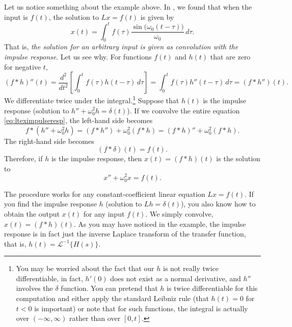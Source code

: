 Let us notice something about the example above. 
In ,
we found that
when the input is $f(t)$, the solution to $Lx = f(t)$
is given by
\begin{equation*}
x(t) = 
\int_0^t
f(\tau) 
\frac{\sin \bigl( \omega_0 (t-\tau) \bigr)}{\omega_0} \, d\tau .
\end{equation*}
That is, \emph{the solution for an arbitrary input is given as
convolution with the impulse response}.  Let us see why.
For functions $f(t)$ and $h(t)$ that are zero for negative $t$,
\begin{equation*}
(f * h)''(t) =
\frac{d^2}{dt^2}\left[
\int_0^t
f(\tau) 
h(t-\tau) \, d\tau \right]
=
\int_0^t
f(\tau) 
h''(t-\tau) \, d\tau
= (f * h'')(t) .
\end{equation*}
We differentiate twice under the
integral.\footnote{%
You may be worried about the fact that our $h$
is not really twice differentiable, in fact, $h'(0)$
does not exist as a normal derivative, and $h''$ involves
the $\delta$ function.
You can pretend that $h$ is twice differentiable
for this computation and either apply the standard
Leibniz rule (that $h(t)=0$ for $t < 0$ is important) or
note that for such functions,
the integral is actually over
$(-\infty,\infty)$ rather than over $[0,t]$.}
Suppose that $h(t)$ is the impulse response (solution to $h''+\omega_0^2 h = \delta(t)$).
If we convolve the entire equation \eqref{eq:lteximpulseresp},
the left-hand side becomes
\begin{equation*}
f * (h'' + \omega_0^2 h) =
(f * h'') + \omega_0^2 (f * h) =
(f * h)'' + \omega_0^2 (f * h) .
\end{equation*}
The right-hand side becomes
\begin{equation*}
(f * \delta)(t) = f(t).
\end{equation*}
Therefore, if $h$ is the impulse response,
then $x(t) = (f * h)(t)$ is the solution to
\begin{equation*}
x'' + \omega_0^2 x = f(t) .
\end{equation*}

The procedure works for any constant-coefficient linear
equation $Lx = f(t)$.
If you find the impulse response $h$
(solution to $Lh = \delta(t)$),
you also know how to obtain the output $x(t)$ for any input $f(t)$.
We simply convolve, $x(t) = (f * h)(t)$.
As you may have noticed in the example,
the impulse response is in fact just the inverse Laplace
transform of the transfer function, that is,
$h(t) = {\mathcal{L}}^{-1} \bigl\{ H(s) \bigr\}$.

